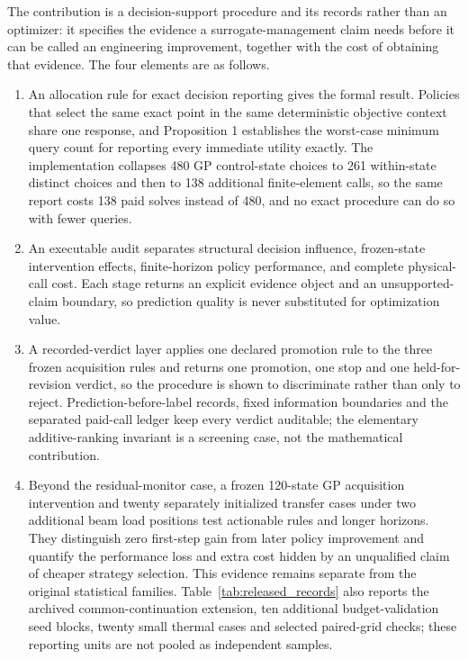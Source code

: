 \documentclass[]{interact}
\providecommand{\tightlist}{\setlength{\itemsep}{0pt}\setlength{\parskip}{0pt}}
\begin{document}
The contribution is a decision-support procedure and its records rather than an optimizer: it specifies the evidence a surrogate-management claim needs before it can be called an engineering improvement, together with the cost of obtaining that evidence. The four elements are as follows.

\begin{enumerate}
\def\labelenumi{\arabic{enumi}.}
\tightlist
\item
  An allocation rule for exact decision reporting gives the formal result. Policies that select the same exact point in the same deterministic objective context share one response, and Proposition 1 establishes the worst-case minimum query count for reporting every immediate utility exactly. The implementation collapses 480 GP control-state choices to 261 within-state distinct choices and then to 138 additional finite-element calls, so the same report costs 138 paid solves instead of 480, and no exact procedure can do so with fewer queries.
\item
  An executable audit separates structural decision influence, frozen-state intervention effects, finite-horizon policy performance, and complete physical-call cost. Each stage returns an explicit evidence object and an unsupported-claim boundary, so prediction quality is never substituted for optimization value.
\item
  A recorded-verdict layer applies one declared promotion rule to the three frozen acquisition rules and returns one promotion, one stop and one held-for-revision verdict, so the procedure is shown to discriminate rather than only to reject. Prediction-before-label records, fixed information boundaries and the separated paid-call ledger keep every verdict auditable; the elementary additive-ranking invariant is a screening case, not the mathematical contribution.
\item
  Beyond the residual-monitor case, a frozen 120-state GP acquisition intervention and twenty separately initialized transfer cases under two additional beam load positions test actionable rules and longer horizons. They distinguish zero first-step gain from later policy improvement and quantify the performance loss and extra cost hidden by an unqualified claim of cheaper strategy selection. This evidence remains separate from the original statistical families. Table~\ref{tab:released_records} also reports the archived common-continuation extension, ten additional budget-validation seed blocks, twenty small thermal cases and selected paired-grid checks; these reporting units are not pooled as independent samples.
\end{enumerate}
\end{document}
